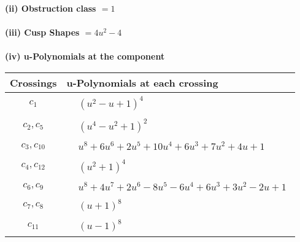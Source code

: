 \documentclass[1p]{elsarticle_modified}
\theoremstyle{definition}
\begin{document}
\flushleft \textbf{(ii) Obstruction class $= 1$}\\~\\
\flushleft \textbf{(iii) Cusp Shapes $= 4 u^2-4$}\\~\\
\newpage\renewcommand{\arraystretch}{1}
\flushleft \textbf{(iv) u-Polynomials at the component}\newline \\
\begin{tabular}{m{50pt}|m{274pt}}
Crossings & \hspace{64pt}u-Polynomials at each crossing \\
\hline $$\begin{aligned}c_{1}\end{aligned}$$&$\begin{aligned}
&(u^2- u+1)^4
\end{aligned}$\\
\hline $$\begin{aligned}c_{2},c_{5}\end{aligned}$$&$\begin{aligned}
&(u^4- u^2+1)^2
\end{aligned}$\\
\hline $$\begin{aligned}c_{3},c_{10}\end{aligned}$$&$\begin{aligned}
&u^8+6 u^6+2 u^5+10 u^4+6 u^3+7 u^2+4 u+1
\end{aligned}$\\
\hline $$\begin{aligned}c_{4},c_{12}\end{aligned}$$&$\begin{aligned}
&(u^2+1)^4
\end{aligned}$\\
\hline $$\begin{aligned}c_{6},c_{9}\end{aligned}$$&$\begin{aligned}
&u^8+4 u^7+2 u^6-8 u^5-6 u^4+6 u^3+3 u^2-2 u+1
\end{aligned}$\\
\hline $$\begin{aligned}c_{7},c_{8}\end{aligned}$$&$\begin{aligned}
&(u+1)^8
\end{aligned}$\\
\hline $$\begin{aligned}c_{11}\end{aligned}$$&$\begin{aligned}
&(u-1)^8
\end{aligned}$\\
\hline
\end{tabular}\\~\\
\end{document}
